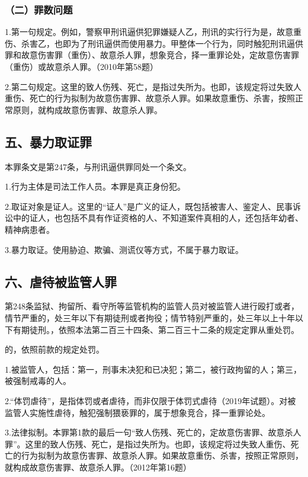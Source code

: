 \subsubsection*{（二）罪数问题}

1.第一句规定。例如，警察甲刑讯逼供犯罪嫌疑人乙，刑讯的实行行为是，故意重伤、杀害乙，也即为了刑讯逼供而使用暴力。甲整体一个行为，同时触犯刑讯逼供罪和故意伤害罪（重伤）、故意杀人罪，想象竞合，择一重罪论处，定故意伤害罪（重伤）或故意杀人罪。（2010年第58题）

2.第二句规定。这里的致人伤残、死亡，是指过失所为。也即，该规定将过失致人重伤、死亡的行为拟制为故意伤害罪、故意杀人罪。如果故意重伤、杀害，按照正常原则，就构成故意伤害罪、故意杀人罪。

\subsection*{五、暴力取证罪}

本罪条文是第247条，与刑讯逼供罪同处一个条文。

1.行为主体是司法工作人员。本罪是真正身份犯。

2.取证对象是证人。这里的“证人”是广义的证人，既包括被害人、鉴定人、民事诉讼中的证人，也包括不具有作证资格的人、不知道案件真相的人，还包括年幼者、精神病患者。

3.暴力取证。使用胁迫、欺骗、测谎仪等方式，不属于暴力取证。

\subsection*{六、虐待被监管人罪}

第248条监狱、拘留所、看守所等监管机构的监管人员对被监管人进行殴打或者，情节严重的，处三年以下有期徒刑或者拘役；情节特别严重的，处三年以上十年以下有期徒刑。，依照本法第二百三十四条、第二百三十二条的规定定罪从重处罚。

的，依照前款的规定处罚。

1.被监管人，包括：第一，刑事未决犯和已决犯；第二，被行政拘留的人；第三，被强制戒毒的人。

2.“体罚虐待”，是指体罚或者虐待，而非仅限于体罚式虐待（2019年试题）。对被监管人实施性虐待，触犯强制猥亵罪的，属于想象竞合，择一重罪论处。

3.法律拟制。本罪第1款的最后一句“致人伤残、死亡的，定故意伤害罪、故意杀人罪”。这里的致人伤残、死亡，是指过失所为。也即，该规定将过失致人重伤、死亡的行为拟制为故意伤害罪、故意杀人罪。如果故意重伤、杀害，按照正常原则，就构成故意伤害罪、故意杀人罪。（2012年第16题）

